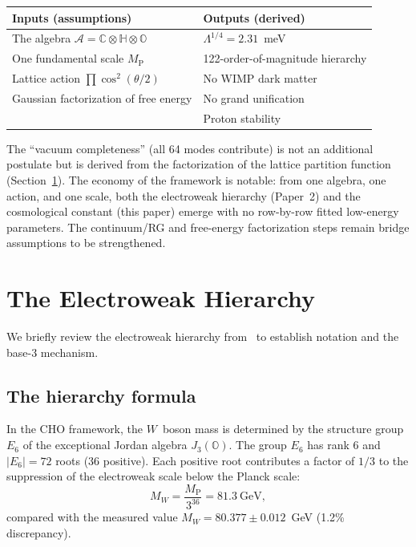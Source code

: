 \documentclass[12pt,a4paper]{article}
\theoremstyle{definition}
\theoremstyle{remark}
\newcommand{\Oct}{\mathbb{O}}
\newcommand{\Quat}{\mathbb{H}}
\newcommand{\Comp}{\mathbb{C}}
\newcommand{\Alg}{\mathcal{A}}
\newcommand{\MP}{M_{\mathrm{P}}}
\begin{document}
\begin{center}
\begin{tabular}{ll}
\hline
\textbf{Inputs (assumptions)} & \textbf{Outputs (derived)} \\
\hline
The algebra $\Alg = \Comp\otimes\Quat\otimes\Oct$ & $\Lambda^{1/4} = 2.31$~meV \\
One fundamental scale $\MP$ & 122-order-of-magnitude hierarchy \\
Lattice action $\prod \cos^2(\theta/2)$ & No WIMP dark matter \\
Gaussian factorization of free energy & No grand unification \\
 & Proton stability \\
\hline
\end{tabular}
\end{center}
\noindent The ``vacuum completeness'' (all 64 modes contribute) is not an 
additional postulate but is derived from the factorization of the lattice 
partition function (Section~\ref{sec:ew}). The economy of the framework is 
notable: from one algebra, one action, and one scale, both the electroweak 
hierarchy (Paper~2) and the cosmological constant (this paper) emerge with 
no row-by-row fitted low-energy parameters. The continuum/RG and free-energy 
factorization steps remain bridge assumptions to be strengthened.

\section{The Electroweak Hierarchy}
\label{sec:ew}

We briefly review the electroweak hierarchy from~\cite{Paper2} to 
establish notation and the base-3 mechanism.

\subsection{The hierarchy formula}

In the CHO framework, the $W$~boson mass is determined by the structure 
group $E_6$ of the exceptional Jordan algebra $J_3(\Oct)$. The group $E_6$ 
has rank 6 and $|E_6| = 72$ roots (36 positive). Each positive root 
contributes a factor of $1/3$ to the suppression of the electroweak scale 
below the Planck scale:
\begin{equation}
M_W = \frac{\MP}{3^{36}} = 81.3~\text{GeV},
\label{eq:mw}
\end{equation}
compared with the measured value $M_W = 80.377 \pm 0.012$~GeV 
(1.2\% discrepancy).
\end{document}
